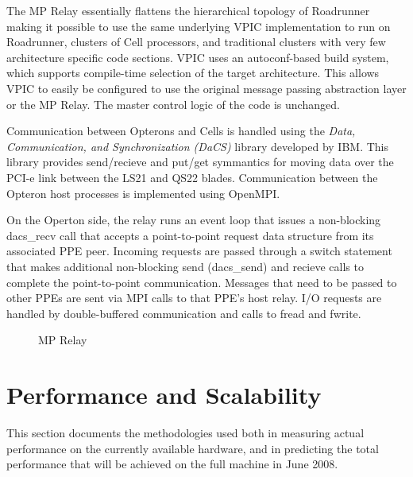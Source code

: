 \documentclass[letter,10pt]{article}
\begin{document}
The MP Relay essentially flattens the hierarchical topology of
Roadrunner making it possible to use the same underlying
VPIC implementation to run on Roadrunner, clusters of Cell processors,
and traditional clusters with very few architecture specific code 
sections.  VPIC uses an autoconf-based build system, which supports
compile-time selection of the target architecture.  This allows
VPIC to easily be configured to use the original message passing
abstraction layer or the MP Relay.  The master control logic of the
code is unchanged.

Communication between Opterons and Cells is handled using the
\emph{Data, Communication, and Synchronization (DaCS)} library developed by
IBM.  This library provides send/recieve and put/get symmantics
for moving data over the PCI-e link between the LS21 and QS22 blades.
Communication between the Opteron host processes is implemented
using OpenMPI.

On the Operton side, the relay runs an event loop that issues
a non-blocking dacs\_recv call that accepts a point-to-point request
data structure from its associated PPE peer.
Incoming requests are passed through a switch statement
that makes additional non-blocking
send (dacs\_send) and recieve calls to complete the
point-to-point communication.  Messages that need to be
passed to other PPEs are sent via MPI calls to that PPE's host relay.
I/O requests are handled by double-buffered communication and
calls to fread and fwrite.

\begin{figure}
    \begin{center}
    \scalebox{0.25}{}
    \caption{MP Relay}
    \label{fig:relay}
    \end{center}
\end{figure}

\section*{Performance and Scalability} \label{sec:performance}

This section documents the methodologies used both in measuring actual performance on the currently available hardware, and in predicting the total performance that will be achieved on the full machine in June 2008.
\end{document}
